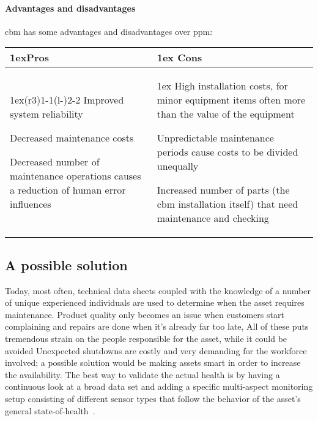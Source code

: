 \paragraph{Advantages and disadvantages}
\acl{cbm} has some advantages and disadvantages over \acl{ppm}:
\begin{table}[!h]
    \begin{tabularx}{\textwidth}{>{\parskip1ex}X@{\kern4\tabcolsep}>{\parskip1ex}X}
        \toprule
        \hfil\bfseries Pros
        &
        \hfil\bfseries Cons
        \\\cmidrule(r{3\tabcolsep}){1-1}\cmidrule(l{-\tabcolsep}){2-2}
        Improved system reliability\par
        Decreased maintenance costs\par
        Decreased number of maintenance operations causes a reduction of human error influences\par
        &
        High installation costs, for minor equipment items often more than the value of the equipment\par
        Unpredictable maintenance periods cause costs to be divided unequally\par
        Increased number of parts (the \acs{cbm} installation itself) that need maintenance and checking\par
        \\\bottomrule
    \end{tabularx}
\end{table}

\subsection{A possible solution}
Today, most often, technical data sheets coupled with the knowledge of a number of unique experienced individuals are used to determine when the asset requires maintenance.
Product quality only becomes an issue when customers start complaining and repairs are done when it's already far too late,
All of these puts tremendous strain on the people responsible for the asset, while it could be avoided
Unexpected shutdowns are costly and very demanding for the workforce involved; a possible solution would be making assets smart in order to increase the availability.
The best way to validate the actual health is by having a continuous look at a broad data set and adding a specific multi-aspect monitoring setup
consisting of different sensor types that follow the behavior of the asset's general state-of-health~\cite{Misc:zensor_official_website}.

